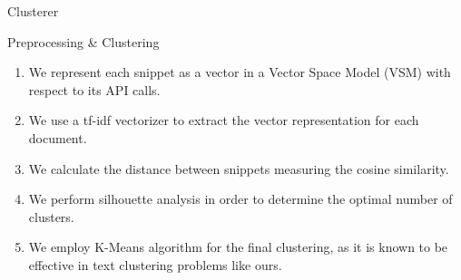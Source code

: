 \documentclass[compress]{beamer}
\begin{document}

\begin{frame}{Clusterer}

\begin{block}{Preprocessing \& Clustering}
\begin{enumerate}
	\item We represent each snippet as a vector in a {\Medium Vector Space Model} (VSM) with respect to its API calls.
	\item We use a {\Medium tf-idf} vectorizer to extract the vector representation for each document.
	\item We calculate the distance between snippets measuring the {\Medium cosine similarity}.
	\item We perform {\Medium silhouette analysis} in order to determine the optimal number of clusters.
	\item We employ {\Medium K-Means} algorithm for the final clustering, as it is known to be effective in text clustering problems like ours.
	
\end{enumerate}
\end{block}

\end{frame}
\end{document}

